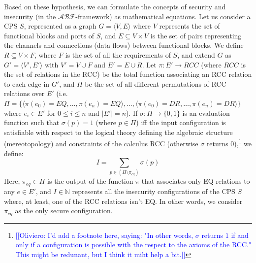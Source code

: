 \documentclass[runningheads]{llncs}
\newcommand{\assertionRegion}{\mathcal{A}}
\newcommand{\beliefRegion}{\mathcal{B}}
\newcommand{\factRegion}{\mathcal{F}}
\newcommand{\abftheory}{\assertionRegion\beliefRegion\factRegion}
\newcommand{\ON}[1]{\footnote{\textcolor{blue}{[[Oliviero: #1]]}}}
\begin{document}
Based on these hypothesis, we can formulate the concepts of security and
insecurity (in the $\abftheory$-framework) as mathematical equations.  Let us
consider a CPS $S$, represented as a graph $G=\langle V,E\rangle$ where $V$
represents the set of functional blocks and ports of $S$, and $E\subseteq
V\times V$ is the set of pairs representing the channels and connections (data
flows) between functional blocks. We define $R\subseteq V\times F$, where $F$
is the set of all the requirements of $S$,
and extend $G$ as $G'=\langle V',E'\rangle$ with $V'=V\cup F$ and $E'= E\cup R$. Let $\pi:
E'\rightarrow RCC$ (where $RCC$ is the set of relations in the RCC) be the
total function associating an RCC relation to each edge in $G'$, and $\Pi$ be
the set of all different permutations of RCC relations over $E'$ (i.e.
$\Pi=\{\langle\pi(e_0)=EQ,\ldots,\pi(e_n)=EQ\rangle,\ldots,\langle
\pi(e_0)=DR,\ldots,\pi(e_n)=DR\rangle\}$ where $e_i\in E'$ for $0\leq i \leq n$ and $|E'|=n$). If $\sigma:\Pi\rightarrow\{0,1\}$ is
an evaluation function such that $\sigma(p)=1$ (where $p\in\Pi$) iff the input
configuration is satisfiable with respect to the logical theory defining the
algebraic structure (mereotopology) and constraints of the calculus RCC
(otherwise $\sigma$ returns $0$),\ON{I'd add a footnote here, saying: "In other words, $\sigma$ returns $1$ if and only if a configuration is possible with the respect to the axioms of the RCC." This might be redunant, but I think it miht help a bit.} we define:
\begin{displaymath}
	I=\sum_{p\in(\Pi\setminus\pi_{eq})} \sigma(p)
\end{displaymath}
Here, $\pi_{eq}\in\Pi$ is the output of the function $\pi$ that associates only EQ relations
to any $e\in E'$, and $I\in\mathbb{N}$ represents all the insecurity configurations
of the CPS $S$ where, at least, one of the RCC relations isn't EQ.
In other words, we consider $\pi_{eq}$ as the only secure configuration.
\end{document}
